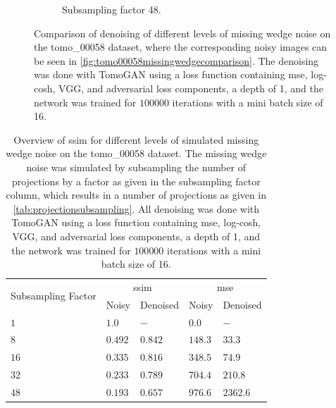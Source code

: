 \begin{figure}
\begin{subfigure}[t]{.45\textwidth}
    \caption{Subsampling factor 48. }
  \end{subfigure}
  \caption[Denoising of four different levels of missing wedge noise]{Comparison of denoising of different levels of missing wedge noise on the tomo\_00058 dataset, where the corresponding noisy images can be seen in \cref{fig:tomo00058missingwedgecomparison}. The denoising was done with TomoGAN using a loss function containing \acrshort{mse}, log-cosh, VGG, and adversarial loss components, a depth of 1, and the network was trained for $100 000$ iterations with a mini batch size of 16. }
  \label{fig:tomo00058missingwedgecomparisondenoised}
\end{figure}


\begin{table}[htbp]
  \centering
  \caption[SSIM for different levels of simulated missing wedge noise and corresponding values after denoising]{Overview of \acrshort{ssim} for different levels of simulated missing wedge noise on the tomo\_00058 dataset. The missing wedge noise was simulated by subsampling the number of projections by a factor as given in the subsampling factor column, which results in a number of projections as given in \cref{tab:projectionsubsampling}. All denoising was done with TomoGAN using a loss function containing \acrshort{mse}, log-cosh, VGG, and adversarial loss components, a depth of 1, and the network was trained for $100 000$ iterations with a mini batch size of 16. }
  \label{tab:missingwedgessim}
  \begin{tabular}{lllll}
  \hline
  \multirow{2}{*}{Subsampling Factor} & \multicolumn{2}{c}{\acrshort{ssim}} & \multicolumn{2}{c}{\acrshort{mse}}  \\
  {} & Noisy & Denoised & Noisy & Denoised \\
  \hhline{=====}
  $1$  & $1.0$ & $-$ & $0.0$ & $-$ \\
  $8$  & $0.492$ & $0.842$ & $148.3$ & $33.3$ \\
  $16$ & $0.335$ & $0.816$ & $348.5$ & $74.9$ \\
  $32$ & $0.233$ & $0.789$ & $704.4$ & $210.8$ \\
  $48$ & $0.193$ & $0.657$ & $976.6$ & $2362.6$ \\
  \hline
  \end{tabular}
\end{table}

